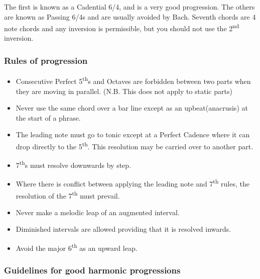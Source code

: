 \documentclass{article}
\begin{document}
The first is known as a Cadential 6/4, and is a very good progression.
The others are known as Passing 6/4s and are usually avoided by Bach.\footnotemark
Seventh chords are 4 note chords and any inversion is permissible, but you should not use the 2\textsuperscript{nd} inversion.

\subsubsection{Rules of progression}

\begin{itemize}
    \item Consecutive Perfect 5\textsuperscript{th}s and Octaves are forbidden between two parts when they are moving in parallel.
        (N.B. This does not apply to static parts)
    \item Never use the same chord over a bar line except as an upbeat(anacrusis) at the start of a phrase.
    \item The leading note must go to tonic except at a Perfect Cadence where it can drop directly to the 5\textsuperscript{th}.
        This resolution may be carried over to another part.
    \item 7\textsuperscript{th}s must resolve downwards by step.
    \item Where there is conflict between applying the leading note and 7\textsuperscript{th} rules, the resolution of the 7\textsuperscript{th} must prevail.
    \item Never make a melodic leap of an augmented interval.
    \item Diminished intervals are allowed providing that it is resolved inwards.
    \item Avoid the major 6\textsuperscript{th} as an upward leap.
\end{itemize}

\subsubsection{Guidelines for good harmonic progressions}
\end{document}
